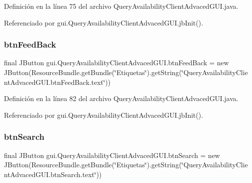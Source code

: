 Definición en la línea 75 del archivo Query\+Availability\+Client\+Advaced\+G\+U\+I.\+java.



Referenciado por gui.\+Query\+Availability\+Client\+Advaced\+G\+U\+I.\+jb\+Init().

\mbox{\label{classgui_1_1_query_availability_client_advaced_g_u_i_a8d6433ba8b1b6feb92be582d0caf09ec}} 
\subsubsection{\texorpdfstring{btnFeedBack}{btnFeedBack}}
{\footnotesize\ttfamily final J\+Button gui.\+Query\+Availability\+Client\+Advaced\+G\+U\+I.\+btn\+Feed\+Back = new J\+Button(Resource\+Bundle.\+get\+Bundle(\char`\"{}Etiquetas\char`\"{}).get\+String(\char`\"{}Query\+Availability\+Client\+Advaced\+G\+U\+I.\+btn\+Feed\+Back.\+text\char`\"{}))\hspace{0.3cm}{\ttfamily [private]}}



Definición en la línea 82 del archivo Query\+Availability\+Client\+Advaced\+G\+U\+I.\+java.



Referenciado por gui.\+Query\+Availability\+Client\+Advaced\+G\+U\+I.\+jb\+Init().

\mbox{\label{classgui_1_1_query_availability_client_advaced_g_u_i_ae3c0a2ae49819aef2cf667f448686f6f}} 
\subsubsection{\texorpdfstring{btnSearch}{btnSearch}}
{\footnotesize\ttfamily final J\+Button gui.\+Query\+Availability\+Client\+Advaced\+G\+U\+I.\+btn\+Search = new J\+Button(Resource\+Bundle.\+get\+Bundle(\char`\"{}Etiquetas\char`\"{}).get\+String(\char`\"{}Query\+Availability\+Client\+Advaced\+G\+U\+I.\+btn\+Search.\+text\char`\"{}))\hspace{0.3cm}{\ttfamily [private]}}



